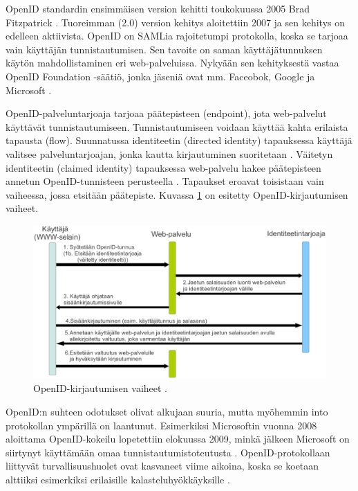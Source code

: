 OpenID standardin ensimmäisen version kehitti toukokuussa 2005 Brad Fitzpatrick \cite{openid}. Tuoreimman (2.0) version kehitys aloitettiin 2007 ja sen kehitys on edelleen aktiivista. OpenID on SAMLia rajoitetumpi protokolla, koska se tarjoaa vain käyttäjän tunnistautumisen. Sen tavoite on saman käyttäjätunnuksen käytön mahdollistaminen eri web-palveluissa. Nykyään sen kehityksestä vastaa \mbox{OpenID} Foundation -säätiö, jonka jäseniä ovat mm. Faceobok, Google ja Microsoft \cite{openid_foundation}.

OpenID-palveluntarjoaja tarjoaa päätepisteen (endpoint), jota web-palvelut käyttävät tunnistautumiseen. Tunnistautumiseen voidaan käyttää kahta erilaista tapausta (flow). Suunnatussa identiteetin (directed identity) tapauksessa käyttäjä valitsee palveluntarjoajan, jonka kautta kirjautuminen suoritetaan \cite{openid}. Väitetyn identiteetin (claimed identity) tapauksessa web-palvelu hakee päätepisteen annetun OpenID\--tun\-nis\-teen perusteella \cite{openid}. Tapaukset eroavat toisistaan vain vaiheessa, jossa etsitään päätepiste. Kuvassa \ref{openid_flow} on esitetty OpenID-kirjautumisen vaiheet.

\begin{figure}[ht]
\centering
\includegraphics[width=\textwidth]{teknologiat/protokollat/openid.eps}
\caption{OpenID-kirjautumisen vaiheet \cite{openid}.}%
\label{openid_flow}
\end{figure}

OpenID:n suhteen odotukset olivat alkujaan suuria, mutta myöhemmin into protokollan ympärillä on laantunut. Esimerkiksi Microsoftin vuonna 2008 aloittama OpenID-kokeilu lopetettiin elokuussa 2009, minkä jälkeen Microsoft on siirtynyt käyttämään omaa tunnistautumistoteutusta \cite{openid_microsoft}. OpenID-protokollaan liittyvät turvallisuushuolet ovat kasvaneet viime aikoina, koska se koetaan alttiiksi esimerkiksi erilaisille kalasteluhyökkäyksille \cite{billion_keys}.

